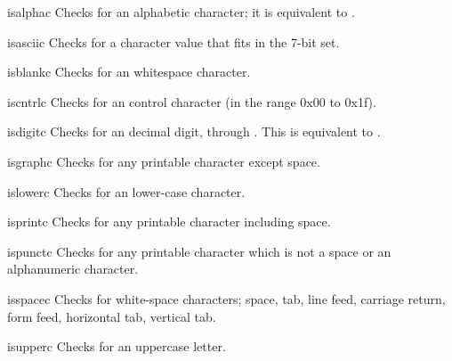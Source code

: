 \begin{funcdesc}{isalpha}{c}
Checks for an \ASCII{} alphabetic character; it is equivalent to
.
\end{funcdesc}

\begin{funcdesc}{isascii}{c}
Checks for a character value that fits in the 7-bit \ASCII{} set.
\end{funcdesc}

\begin{funcdesc}{isblank}{c}
Checks for an \ASCII{} whitespace character.
\end{funcdesc}

\begin{funcdesc}{iscntrl}{c}
Checks for an \ASCII{} control character (in the range 0x00 to 0x1f).
\end{funcdesc}

\begin{funcdesc}{isdigit}{c}
Checks for an \ASCII{} decimal digit,  through
.  This is equivalent to .
\end{funcdesc}

\begin{funcdesc}{isgraph}{c}
Checks for \ASCII{} any printable character except space.
\end{funcdesc}

\begin{funcdesc}{islower}{c}
Checks for an \ASCII{} lower-case character.
\end{funcdesc}

\begin{funcdesc}{isprint}{c}
Checks for any \ASCII{} printable character including space.
\end{funcdesc}

\begin{funcdesc}{ispunct}{c}
Checks for any printable \ASCII{} character which is not a space or an
alphanumeric character.
\end{funcdesc}

\begin{funcdesc}{isspace}{c}
Checks for \ASCII{} white-space characters; space, tab, line feed,
carriage return, form feed, horizontal tab, vertical tab.
\end{funcdesc}

\begin{funcdesc}{isupper}{c}
Checks for an \ASCII{} uppercase letter.
\end{funcdesc}

